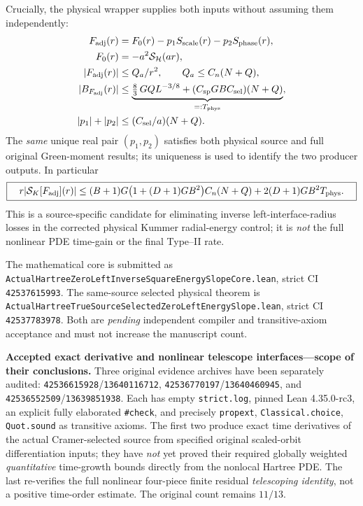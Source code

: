 \documentclass[11pt]{amsart}
\newcommand{\HH}{\mathcal H}
\begin{document}
Crucially, the physical wrapper supplies both inputs without
assuming them independently:
\begin{align*}
 F_{\rm adj}(r)&=F_0(r)
     -p_1S_{\mathrm{scale}}(r)-p_2S_{\mathrm{phase}}(r),\\
 F_0(r)&=-a^2\mathcal S_{\HH}(ar),\\
 |F_{\rm adj}(r)|&\le Q_a/r^2,\qquad
   Q_a\le C_n(N+Q),\\
 |B_{F_{\rm adj}}(r)|&\le
       \underbrace{\tfrac83\,GQL^{-3/8}
                 +(C_{\rm sp}GBC_{\rm sel})(N+Q)}_{=:T_{\rm phys}},\\
 |p_1|+|p_2|&\le (C_{\rm sel}/a)(N+Q).
\end{align*}
The \emph{same} unique real pair $(p_1,p_2)$ satisfies both
physical source and full original Green-moment results;
its uniqueness is used to identify the two producer outputs.
In particular
\[
 \boxed{\quad
 r|\mathcal S_K[F_{\rm adj}](r)|
   \le (B+1)G\bigl(1+(D+1)GB^2\bigr)C_n(N+Q)
       +2(D+1)GB^2T_{\rm phys}.
 \quad}
\]
This is a source-specific candidate for eliminating inverse
left-interface-radius losses in the corrected physical Kummer
radial-energy control; it is \emph{not} the full nonlinear PDE
time-gain or the final Type--II rate.

The mathematical core is submitted as
\texttt{ActualHartreeZeroLeftInverseSquareEnergySlopeCore.lean},
strict CI \texttt{42537615993}.
The same-source selected physical theorem is
\texttt{ActualHartreeTrueSourceSelectedZeroLeftEnergySlope.lean},
strict CI \texttt{42537783978}. Both are \emph{pending}
independent compiler and transitive-axiom acceptance and must not
increase the manuscript count.

\medskip
\noindent\textbf{Accepted exact derivative and nonlinear telescope
interfaces---scope of their conclusions.}
Three original evidence archives have been separately audited:
\texttt{42536615928}/\texttt{13640116712},
\texttt{42536770197}/\texttt{13640460945},
and \texttt{42536552509}/\texttt{13639851938}.
Each has empty \texttt{strict.log}, pinned Lean 4.35.0-rc3,
an explicit fully elaborated \texttt{\#check}, and precisely
\texttt{propext}, \texttt{Classical.choice},
\texttt{Quot.sound} as transitive axioms.
The first two produce exact time derivatives of the
actual Cramer-selected source from specified original
scaled-orbit differentiation inputs; they have \emph{not}
yet proved their required globally weighted
\emph{quantitative} time-growth bounds directly from the
nonlocal Hartree PDE. The last re-verifies the full
nonlinear four-piece finite residual \emph{telescoping identity},
not a positive time-order estimate.
The original count remains $11/13$.
\end{document}
